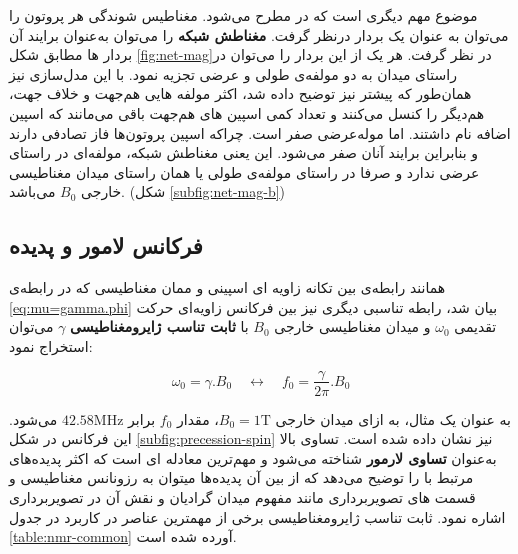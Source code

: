 موضوع مهم دیگری است که در \mri مطرح می‌شود.
مغناطیس شوندگی هر پروتون را می‌توان به عنوان یک بردار در‌نظر گرفت. \textbf{مغناطش شبکه} را می‌توان به‌عنوان برایند آن بردار ها مطابق شکل \ref{fig:net-mag}در نظر گرفت. 
هر یک از این بردار را می‌توان در راستای میدان به دو مولفه‌ی طولی و عرضی تجزیه نمود. با این مدل‌سازی نیز همان‌طور که پیشتر نیز توضیح داده شد، اکثر مولفه هایی هم‌جهت و خلاف جهت، هم‌دیگر را کنسل می‌کنند و تعداد کمی اسپین های هم‌جهت باقی می‌مانند که اسپین اضافه نام داشتند. اما موله‌عرضی صفر است. چراکه اسپین پروتون‌ها فاز تصادفی دارند و بنابراین برایند آنان صفر می‌شود. این یعنی مغناطش شبکه، مولفه‌ای در راستای عرضی ندارد و صرفا در راستای مولفه‌ی طولی یا همان راستای میدان مغناطیسی خارجی $B_0$ می‌باشد. (شکل \ref{subfig:net-mag-b})

\subsection{ فرکانس لامور و پدیده \nmr}

همانند رابطه‌ی بین تکانه زاویه ای اسپینی و ممان مغناطیسی که در رابطه‌ی \ref{eq:mu=gamma.phi} بیان شد، رابطه تناسبی دیگری نیز بین فرکانس زاویه‌ای حرکت تقدیمی $\omega_0$ و میدان مغناطیسی خارجی $B_0$  
با \textbf{ثابت تناسب ژایرومغناطیسی}
$\gamma$
می‌توان استخراج نمود:


\removevspace
\begin{equation}\label{eq:larmor}
	\omega_0 = \gamma . B_0 \quad \leftrightarrow \quad f_0 = \frac{\gamma}{2\pi}. B_0
\end{equation}

به عنوان یک مثال، به ازای میدان خارجی $B_0=1 \mathrm{T}$، مقدار $f_0$ برابر $42.58 \mathrm{MHz}$ می‌شود. این فرکانس در شکل \ref{subfig:precession-spin}
نیز نشان داده شده است.
تساوی بالا به‌عنوان \textbf{تساوی لارمور}
شناخته می‌شود و مهم‌ترین معادله ای است که اکثر پدیده‌های مرتبط با \mri را توضیح می‌دهد که از بین آن پدیده‌ها میتوان به رزونانس مغناطیسی و قسمت های تصویر‌برداری مانند مفهوم میدان گرادیان و نقش آن در تصویر‌برداری اشاره نمود. ثابت تناسب ژایرومغناطیسی برخی از مهمترین عناصر در کاربرد \mri در جدول \ref{table:nmr-common} آورده شده است.


